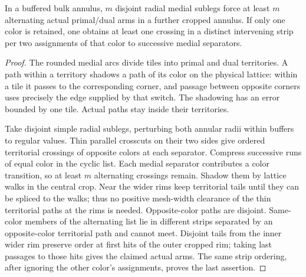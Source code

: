 \begin{lemma}\label{chordal:territories}
In a buffered bulk annulus, $m$ disjoint radial medial sublegs force
at least $m$ alternating actual primal/dual arms in a further cropped
annulus.  If only one color is retained, one obtains at least one
crossing in a distinct intervening strip per two assignments of that
color to successive medial separators.
\end{lemma}
\begin{proof}
The rounded medial arcs divide tiles into primal and dual territories.
A path within a territory shadows a path of its color on the physical
lattice: within a tile it passes to the corresponding corner, and
passage between opposite corners uses precisely the edge supplied
by that switch.  The shadowing has an error bounded by one tile.
Actual paths stay inside their territories.

Take disjoint simple radial sublegs, perturbing both annular radii
within buffers to regular values.  Thin parallel crosscuts on their
two sides give ordered territorial crossings of opposite colors at
each separator.  Compress successive runs of equal color in the
cyclic list.  Each medial separator contributes a color transition,
so at least $m$ alternating crossings remain.  Shadow them by lattice
walks in the central crop.  Near the wider rims keep territorial tails
until they can be spliced to the walks; thus no positive mesh-width
clearance of the thin territorial paths at the rims is needed.
Opposite-color paths are disjoint.  Same-color members of the
alternating list lie in different strips separated by an
opposite-color territorial path and cannot meet.  Disjoint tails
from the inner wider rim preserve order at first hits of the outer
cropped rim; taking last passages to those hits gives the claimed
actual arms.  The same strip ordering, after ignoring the other
color's assignments, proves the last assertion.
\end{proof}

